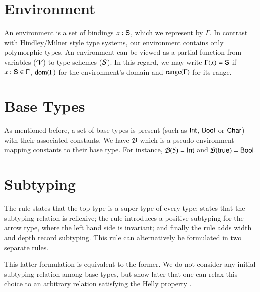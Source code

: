 \documentclass{report}
\begin{document}
  \section{Environment}
  An environment is a set of bindings $x : \textsf{S}$, which we represent by
  $\Gamma$. In contrast with Hindley/Milner style type systems, our environment contains only
  polymorphic types.
  An environment can be viewed as a partial function from variables ($\mathcal{V}$) to type
  schemes ($\mathcal{S}$). In this regard, we may write $\Gamma(x)=\textsf{S}$ if
  $x : \textsf{S}\in\Gamma$, $\mathop{\rm dom}\nolimits(\Gamma)$ for the environment's domain and
  $\mathop{\rm range}\nolimits(\Gamma)$ for its range.
  
  \section{Base Types}
  As mentioned before, a set of base types is present (such as $\textsf{Int}$,
  $\textsf{Bool}$ or $\textsf{Char}$) with their associated constants. We have $\mathcal{B}$ which is
  a pseudo-environment mapping constants to their
  base type. For instance, $\mathcal{B}(5) = \textsf{Int}$ and $\mathcal{B}(\textsf{true}) = \textsf{Bool}$.
  
  \section{Subtyping}
  The \stoptype rule states that the top type is a super type of every type;
  \sref states that the subtyping relation is reflexive; the \sfun rule introduces
  a positive subtyping for the arrow type, where the left hand side is invariant; and
  finally the \srec rule adds width and depth record subtyping. This rule can alternatively
  be formulated in two separate rules.
  This latter formulation is equivalent to the former. We do not consider
  any initial subtyping relation among base types, but show later that one can relax
  this choice to an arbitrary relation satisfying the Helly property .
  
\end{document}
